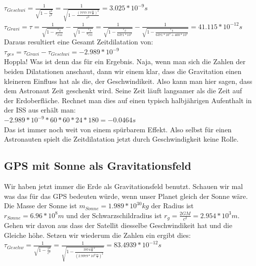 \begin{refsection}
\( \tau_{Geschwi} =  \frac{1}{\sqrt{1 - \frac{v^2}{c^2}}} = \frac{1}{\sqrt{1 - \frac{( 7777.77\frac{m}{s})^2}{c^2}}} = 3.025 * 10^{-9}s\) \\

\( \tau_{Gravi}= \tau = \frac{1}{\sqrt{1-\frac{r_g}{r_{Erde}}}} - \frac{1}{\sqrt{1-\frac{r_g}{r_{ISS}}}} 
= \frac{1}{\sqrt{1-\frac{r_g}{6371 * 10^3}}} - \frac{1}{\sqrt{1-\frac{r_g}{6371 * 10^3 + 400 * 10^3}}} = 41.115 * 10^{-12}s \) \\

\noindent{}Daraus resultiert eine Gesamt Zeitdilatation von:\\

\( \tau_{ges} = \tau_{Gravi} - \tau_{Geschwi} = -2.989 * 10^{-9} \) \\

\noindent{}Hoppla! Was ist denn das für ein Ergebnis. Naja, wenn man sich die Zahlen der beiden Dilatationen anschaut, dann wir einem klar, dass die Gravitation einen kleineren Einfluss hat als die, der Geschwindikeit. Also kann man hier sagen, dass dem Astronaut Zeit geschenkt wird. Seine Zeit läuft langsamer als die Zeit auf der Erdoberfläche. Rechnet man dies auf einen typisch halbjährigen Aufenthalt in der ISS aus erhält man:\\

\( -2.989 * 10^{-9} * 60 * 60 * 24 * 180 = -0.0464s \) \\

\noindent{}Das ist immer noch weit von einem spürbarem Effekt. Also selbst für einen Astronauten spielt die Zeitdilatation jetzt durch Geschwindigkeit keine Rolle.

\subsection{GPS mit Sonne als Gravitationsfeld}
Wir haben jetzt immer die Erde als Gravitationsfeld benutzt. Schauen wir mal was das für das GPS bedeuten würde, wenn unser Planet gleich der Sonne wäre. Die Masse der Sonne ist \( m_{Sonne} = 1.989 * 10^30kg \) der Radius ist \( r_{Sonne} = 6.96 * 10^8m \) und der Schwarzschildradius ist \( r_g = \frac{2GM}{c^2} = 2.954 * 10^3m \). Gehen wir davon aus dass der Satellit diesselbe Geschwindikeit hat und die Gleiche höhe. Setzen wir wiederum die Zahlen ein ergibt dies:\\

\( \tau_{Geschw} = \frac{1}{\sqrt{1 - \frac{v^2}{c^2}}} = \frac{1}{\sqrt{1 - \frac{3874 \frac{m}{s}^2}{(2.9979 * 10^8 \frac{m}{s} )^2}}} = 83.4939 * 10^{-12}s \) \\


\end{refsection}
